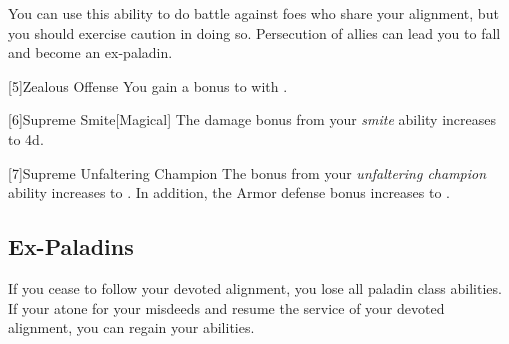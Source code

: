         You can use this ability to do battle against foes who share your alignment, but you should exercise caution in doing so.
        Persecution of allies can lead you to fall and become an ex-paladin.

        [5]{Zealous Offense} You gain a  bonus to  with .

        [6]{Supreme Smite}[Magical] The damage bonus from your \textit{smite} ability increases to \plus4d.

        [7]{Supreme Unfaltering Champion}
        The  bonus from your \textit{unfaltering champion} ability increases to .
        In addition, the Armor defense bonus increases to .


    \subsection{Ex-Paladins}
        If you cease to follow your devoted alignment, you lose all  paladin class abilities.
        If your atone for your misdeeds and resume the service of your devoted alignment, you can regain your abilities.

\newpage
